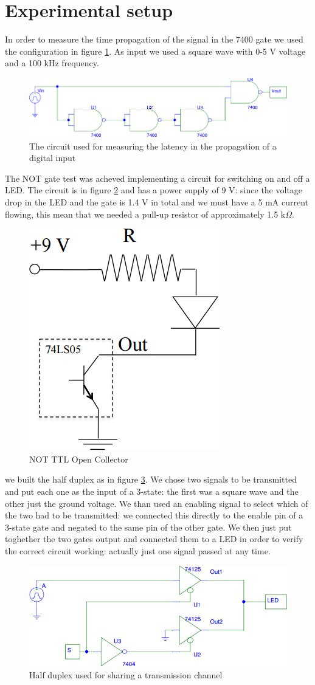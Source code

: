 \section{Experimental setup}
In order to measure the time propagation of the signal in the 7400 gate we used the configuration in figure \ref{latency}. As input we used a square wave with 0-5 V voltage and a 100 kHz frequency.
\begin{figure}[H]
\centering
\includegraphics[width=.7\textwidth]{10/latency.png}
\caption{The circuit used for measuring the latency in the propagation of a digital input}\label{latency}
\end{figure}
The NOT gate test was acheved implementing a circuit for switching on and off a LED. The circuit is in figure \ref{LED_ON_OFF} and has a power supply of 9 V: since the voltage drop in the LED and the gate is 1.4 V in total and we must have a 5 mA current flowing, this mean that we needed a pull-up resistor of approximately 1.5 k$\Omega$.
\begin{figure}[H]
\centering
\includegraphics[width=.3\textwidth]{10/LED_ON_OFF.png}
\caption{NOT TTL Open Collector}\label{LED_ON_OFF}
\end{figure}
we built the half duplex as in figure \ref{TTL_3state}. We chose two signals to be transmitted and put each one as the input of a 3-state: the first was a square wave and the other just the ground voltage. We than used an enabling signal to select which of the two had to be transmitted: we connected this directly to the enable pin of a 3-state gate and negated to the same pin of the other gate. We then just put toghether the two gates output and connected them to a LED in order to verify the correct circuit working: actually just one signal passed at any time.
\begin{figure}[H]
\centering
\includegraphics[width=.7\textwidth]{10/TTL_3state.png}
\caption{Half duplex used for sharing a transmission channel}\label{TTL_3state}
\end{figure}

